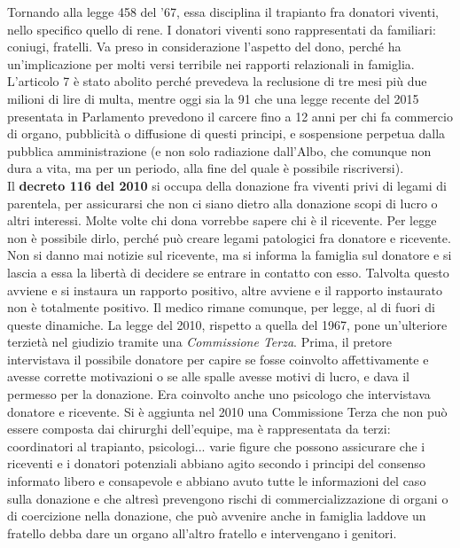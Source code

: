Tornando alla legge 458 del '67, essa disciplina il trapianto fra
donatori viventi, nello specifico quello di rene. I donatori viventi
sono rappresentati da familiari: coniugi, fratelli. Va preso in
considerazione l'aspetto del dono, perché ha un'implicazione per molti
versi terribile nei rapporti relazionali in famiglia.
\\
L'articolo 7 è stato abolito perché prevedeva la reclusione di tre mesi
più due milioni di lire di multa, mentre oggi sia la 91 che una legge
recente del 2015 presentata in Parlamento prevedono il carcere fino a 12
anni per chi fa commercio di organo, pubblicità o diffusione di questi
principi, e sospensione perpetua dalla pubblica amministrazione (e non
solo radiazione dall'Albo, che comunque non dura a vita, ma per un
periodo, alla fine del quale è possibile riscriversi).
\\
Il \textbf{decreto 116 del 2010} si occupa della donazione fra viventi
privi di legami di parentela, per assicurarsi che non ci siano dietro
alla donazione scopi di lucro o altri interessi. Molte volte chi dona
vorrebbe sapere chi è il ricevente. Per legge non è possibile dirlo,
perché può creare legami patologici fra donatore e ricevente. Non si
danno mai notizie sul ricevente, ma si informa la famiglia sul donatore
e si lascia a essa la libertà di decidere se entrare in contatto con
esso. Talvolta questo avviene e si instaura un rapporto positivo, altre
avviene e il rapporto instaurato non è totalmente positivo. Il medico
rimane comunque, per legge, al di fuori di queste dinamiche. La legge
del 2010, rispetto a quella del 1967, pone un'ulteriore terzietà nel
giudizio tramite una \emph{Commissione Terza}. Prima, il pretore
intervistava il possibile donatore per capire se fosse coinvolto
affettivamente e avesse corrette motivazioni o se alle spalle avesse
motivi di lucro, e dava il permesso per la donazione. Era coinvolto
anche uno psicologo che intervistava donatore e ricevente. Si è aggiunta
nel 2010 una Commissione Terza che non può essere composta dai chirurghi
dell'equipe, ma è rappresentata da terzi: coordinatori al trapianto,
psicologi... varie figure che possono assicurare che i riceventi e i
donatori potenziali abbiano agito secondo i principi del consenso
informato libero e consapevole e abbiano avuto tutte le informazioni del
caso sulla donazione e che altresì prevengono rischi di
commercializzazione di organi o di coercizione nella donazione, che può
avvenire anche in famiglia laddove un fratello debba dare un organo
all'altro fratello e intervengano i genitori.
\\
